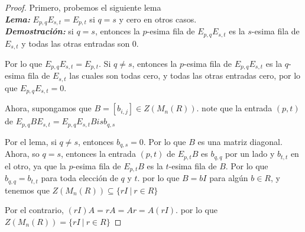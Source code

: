 \begin{problem}[7]
\end{problem}

\begin{proof}
    Primero, probemos el siguiente lema\\
    \textit{\textbf{Lema:}} $E_{p,q}E_{s,t} = E_{p,t}$ si $q=s$ y cero en otros casos.\\
    \textit{\textbf{Demostración:}} si $q=s$, entonces la $p$-esima fila de $E_{p,q}E_{s,t}$ es la $s$-esima fila de $E_{s,t}$ y todas las otras entradas son 0.

    Por lo que $E_{p,q}E_{s,t} = E_{p,t}$. Si $q\neq s$, entonces la $p$-esima fila de $E_{p,q}E_{s,t}$ es la $q$-esima fila de $E_{s,t}$ las cuales son todas cero, y todas las otras entradas cero, por lo que $E_{p,q}E_{s,t} = 0$.

    Ahora, supongamos que $B = [b_{i,j}] \in Z(M_n(R))$. note que la entrada $(p,t)$ de $E_{p,q}BE_{s,t} = E_{p,q}E_{s,t}Bisb_{q,s}$
    
    Por el lema, si $q \neq s$, entonces $b_{q,s} = 0$. Por lo que $B$ es una matriz diagonal. Ahora, so $q=s$, entonces la entrada $(p,t)$ de $E_{p,t}B$ es $b_{q,q}$ por un lado y $b_{t,t}$ en el otro, ya que la $p$-esima fila de $E_{p,t}B$ es la $t$-esima fila de $B$. Por lo que $b_{q,q}=b_{t,t}$ para toda elección de $q$ y $t$. por lo que $B=bI$ para algún $b\in R$, y tenemos que $Z(M_n(R)) \subseteq \{ rI \ |\ r \in R \}$

    Por el contrario, $(rI)A = rA = Ar = A(rI)$. por lo que $Z(M_n(R)) = \{ rI \ |\ r \in R \}$
\end{proof}